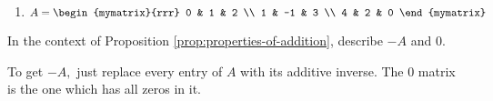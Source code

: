 \begin{enumialphparenastyle}
\begin{ex}
\begin{enumerate}
\item
$A = \begin{mymatrix}{rrr}
0 & 1 & 2 \\
1 & -1 & 3 \\
4 & 2 & 0 
\end{mymatrix}$
\end{enumerate}
\end{ex}

\begin{ex} In the context of Proposition \ref{prop:properties-of-addition}, describe $-A$ and $0.$
\begin{sol}
To get $-A,$ just
replace every entry of $A$ with its additive inverse. The 0 matrix is the
one which has all zeros in it.
\end{sol}
\end{ex}

\end{enumialphparenastyle}